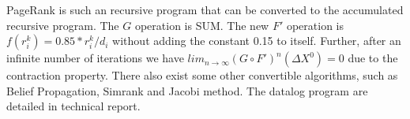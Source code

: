 PageRank is such an recursive program that can be converted to the accumulated recursive program. The $G$ operation is SUM. The new $F'$ operation is $f(r_i^k)=0.85*r_i^k/d_i$ without adding the constant 0.15 to itself. Further, after an infinite number of iterations we have $lim_{n\rightarrow\infty}(G\circ F')^n(\Delta X^0)=0$ due to the contraction property. There also exist some other convertible algorithms, such as Belief Propagation, Simrank and Jacobi method. The datalog program are detailed in technical report\cite{fullversion}. 




\begin{comment}
The key of the conversion is to incrementally compute the origin problem and the difference value $\Delta X^k$ of each recursion can be iteratively computed i.e.
`%
\begin{equation}
\label{eq:con}
\begin{aligned}
X^{k+1}=&X^k+\Delta X^k\\
\Delta X^{k}=&G' \circ F' (\Delta X^{k-1}).
\end{aligned}
\end{equation}
if aggregate function $G'$ satisfied the \textbf{accumulative} condition, the first line of equation \ref{eq:con} can be rewrite as $X^{k+1}=G'(X^0\cup \Delta X^0\cup \Delta X^1 \ldots \Delta X^k)$.%
This is the basic formula of accumulative recursive aggregation which has the same result with normal recursive aggregation .Algorithm can be correctly asynchronized if the \textbf{order-independent} conditions satisfied. Though the basic idea has been proposed,there are still two key problems to be solved. First, how to determine the new aggregation function $G'$. Second,How to determine the incremental value $\Delta X^k$ from $X^k$ and $X^{k+1}$.
Third, how to initialize the incremental value $\Delta X^0$.


Since the new aggregation $G'$ express the relationship between $\Delta X^k$ and $\Delta X^{k-1}$. So the relation can be obtained by evaluate the incremental value between two adjacent recursion. First define the calculation of incremental value as $\Delta X^{k}=diff(X^{k+1},X^{k})$ in which $diff( \cdot , \cdot )$ is a inverse transformation of $G'$, i.e., $X^{k+1}=G'(X^k \cup diff(X^{k+1},X^{k}))$. Then we can try to find a $G'$ satisfied that $diff(G\circ F(X^{k+1}),G \circ F(X^{k})) = G'\circ F(diff(X^{k+1},X^{k}))$. If $G'$ exists and satisfied the community condition, the original algorithm  can be converted. Otherwise, the algorithm can't be converted. 


\end{comment}
